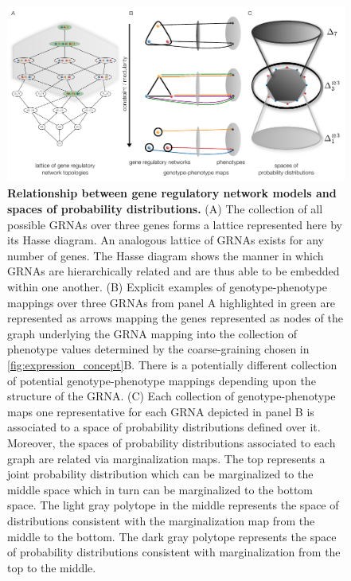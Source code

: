 \begin{figure}[!ht]
\centering
\noindent\includegraphics[width=0.9\columnwidth]{fig/conediagram.pdf}
\caption{{\bf Relationship between gene regulatory network models and spaces of probability distributions.} (A) The collection of all possible GRNAs over three genes forms a lattice represented here by its Hasse diagram. An analogous lattice of GRNAs exists for any number of genes. The Hasse diagram shows the manner in which GRNAs are hierarchically related and are thus able to be embedded within one another. (B) Explicit examples of genotype-phenotype mappings over three GRNAs from panel A highlighted in green are represented as arrows mapping the genes represented as nodes of the graph underlying the GRNA mapping into the collection of phenotype values determined by the coarse-graining chosen in \ref{fig:expression_concept}B. There is a potentially different collection of potential genotype-phenotype mappings depending upon the structure of the GRNA. (C) Each collection of genotype-phenotype maps one representative for each GRNA depicted in panel B is associated to a space of probability distributions defined over it. Moreover, the spaces of probability distributions associated to each graph are related via marginalization maps. The top represents a joint probability distribution which can be marginalized to the middle space which in turn can be marginalized to the bottom space. The light gray polytope in the middle represents the space of distributions consistent with the marginalization map from the middle to the bottom. The dark gray polytope represents the space of probability distributions consistent with marginalization from the top to the middle.}
\label{fig:conediagram}
\end{figure}


